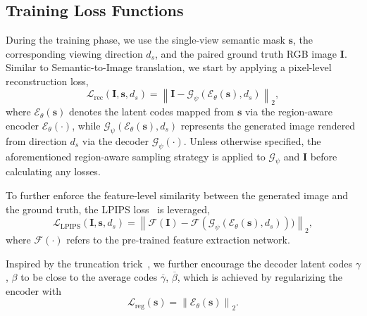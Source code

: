 \documentclass[runningheads]{llncs}
\begin{document}
\subsection{Training Loss Functions}
During the training phase, we use the single-view semantic mask $\mathbf{s}$, the corresponding viewing direction $d_s$, and the paired ground truth RGB image $\mathbf{I}$. Similar to Semantic-to-Image translation, we start by applying a pixel-level reconstruction loss,
\begin{equation}
    \mathcal{L}_{\text{rec}}(\mathbf{I}, \mathbf{s}, d_s) = \left \| \mathbf{I} - \mathcal{G}_\psi(\mathcal{E}_\theta(\mathbf{s}), d_s) \right \|_2,
\end{equation}
where $\mathcal{E}_\theta(\mathbf{s})$ denotes the latent codes mapped from $\mathbf{s}$ via the region-aware encoder $\mathcal{E}_\theta(\cdot)$, while $\mathcal{G}_\psi(\mathcal{E}_\theta(\mathbf{s}), d_s)$ represents the generated image rendered from direction $d_s$ via the decoder $\mathcal{G}_\psi(\cdot)$. Unless otherwise specified, the aforementioned region-aware sampling strategy is applied to $\mathcal{G}_\psi$ and $\mathbf{I}$ before calculating any losses. 

To further enforce the feature-level similarity between the generated image and the ground truth, the LPIPS loss~\cite{zhang2018unreasonable} is leveraged, 
\begin{equation}
    \mathcal{L}_{\text{LPIPS}}(\mathbf{I}, \mathbf{s}, d_s) = \left \| \mathcal{F}(\mathbf{I}) - \mathcal{F}(\mathcal{G}_\psi(\mathcal{E}_\theta(\mathbf{s}), d_s))) \right \|_2,
\end{equation}
where $\mathcal{F}(\cdot)$ refers to the pre-trained feature extraction network.

Inspired by the truncation trick~\cite{karras2019style,richardson2021encoding}, we further encourage the decoder latent codes $\gamma$, $\beta$ to be close to the average codes $\overline{\gamma}$, $\overline{\beta}$, which is achieved by regularizing the encoder with
\begin{equation}
    \mathcal{L}_{\text{reg}}(\mathbf{s}) = \left \| \mathcal{E}_\theta(\mathbf{s}) \right \|_2.
\end{equation}
\end{document}
